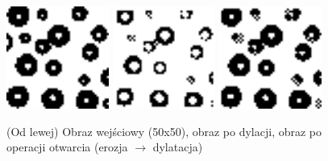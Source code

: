 \documentclass[final,a4paper,openany,12pt]{mwbk}
\begin{document}
\begin{figure}[H]
	\begin{center}
		\includegraphics[width=0.3\textwidth]{1/1Bin_Op_Original}
		\includegraphics[width=0.3\textwidth]{1/1Bin_Op_E_Result}
		\includegraphics[width=0.3\textwidth]{1/1Bin_Op_ED_Result}
	\end{center}
	\caption{(Od lewej) Obraz wejściowy (50x50), obraz po dylacji, obraz po operacji otwarcia (erozja $\rightarrow$ dylatacja)}
\end{figure}
\end{document}
